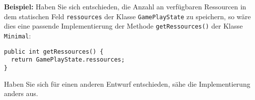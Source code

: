\textbf{Beispiel:} Haben Sie sich entschieden, die Anzahl an verf\"ugbaren Ressourcen in dem statischen Feld \texttt{ressources} der Klasse \texttt{GamePlayState} zu speichern, so w\"are dies eine passende Implementierung der Methode \texttt{getRessources()} der Klasse \texttt{\testAdapter{}Mi\-ni\-mal}:

\begin{lstlisting}
public int getRessources() {
  return GamePlayState.ressources;
}
\end{lstlisting}

Haben Sie sich f\"ur einen anderen Entwurf entschieden, s\"ahe die Implementierung anders aus. 
